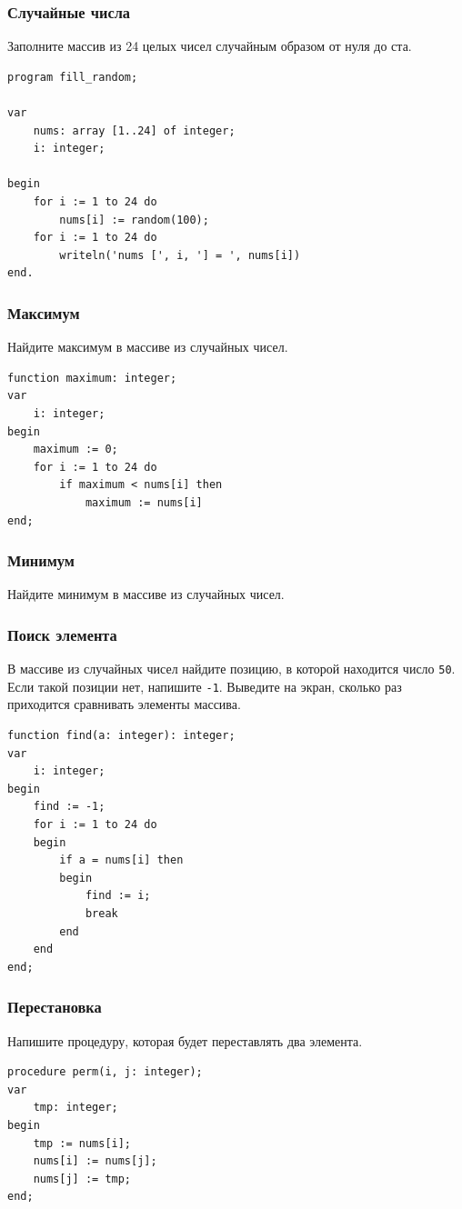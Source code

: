 \documentclass[10,a4paper]{article}
\begin{document}
\subsubsection{Случайные числа}
Заполните массив из 24 целых чисел случайным образом от нуля до ста.
\begin{lstlisting}
program fill_random;

var
    nums: array [1..24] of integer;
    i: integer;

begin
    for i := 1 to 24 do
        nums[i] := random(100);
    for i := 1 to 24 do
        writeln('nums [', i, '] = ', nums[i])
end.
\end{lstlisting}
\subsubsection{Максимум}
Найдите максимум в массиве из случайных чисел.
\begin{lstlisting}
function maximum: integer;
var
    i: integer;
begin
    maximum := 0;
    for i := 1 to 24 do
        if maximum < nums[i] then
            maximum := nums[i]
end;
\end{lstlisting}
\subsubsection{Минимум}
Найдите минимум в массиве из случайных чисел.
\subsubsection{Поиск элемента}
В массиве из случайных чисел найдите позицию, в которой находится число
\texttt{50}. Если такой позиции нет, напишите \texttt{-1}. Выведите на
экран, сколько раз приходится сравнивать элементы массива.
\begin{lstlisting}
function find(a: integer): integer;
var
    i: integer;
begin
    find := -1;
    for i := 1 to 24 do
    begin
        if a = nums[i] then
        begin
            find := i;
            break
        end
    end 
end;
\end{lstlisting}
\subsubsection{Перестановка}
Напишите процедуру, которая будет переставлять два элемента.
\begin{lstlisting}
procedure perm(i, j: integer);
var
    tmp: integer;
begin
    tmp := nums[i];
    nums[i] := nums[j];
    nums[j] := tmp;
end;
\end{lstlisting}
\end{document}
